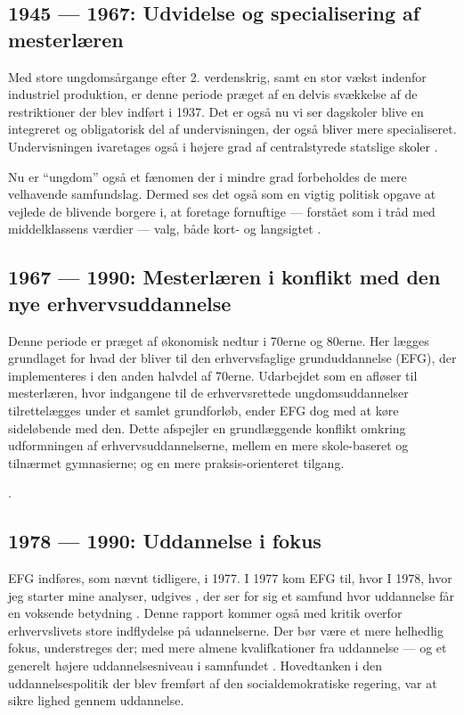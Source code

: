 {\subsection*{1945 — 1967: Udvidelse og specialisering af mesterlæren}

Med store ungdomsårgange efter 2. verdenskrig, samt en stor vækst indenfor industriel produktion, er denne periode præget af en delvis svækkelse af de restriktioner der blev indført i 1937.
Det er også nu vi ser dagskoler blive en integreret og obligatorisk del af undervisningen, der også bliver mere specialiseret.
Undervisningen ivaretages også i højere grad af centralstyrede statslige skoler \autocite[s. 35]{bondergaardHistoricalEmergenceKey2014}.

Nu er “ungdom” også et fænomen der i mindre grad forbeholdes de mere velhavende samfundslag.
Dermed ses det også som en vigtig politisk opgave at vejlede de blivende borgere i, at foretage fornuftige — forstået som i tråd med middelklassens værdier — valg, både kort- og langsigtet \autocite[s. 13ff]{juulDiskurserOmUngdom2013}.

\subsection*{1967 — 1990: Mesterlæren i konflikt med den nye erhvervsuddannelse}

Denne periode er præget af økonomisk nedtur i 70erne og 80erne.
Her lægges grundlaget for hvad der bliver til den erhvervsfaglige grunduddannelse (EFG), der implementeres i den anden halvdel af 70erne.
Udarbejdet som en afløser til mesterlæren, hvor indgangene til de erhvervsrettede ungdomsuddannelser tilrettelægges under et samlet grundforløb, ender EFG dog med at køre sideløbende med den. 
Dette afspejler en grundlæggende konflikt omkring udformningen af erhvervsuddannelserne, mellem en mere skole-baseret og tilnærmet gymnasierne; og en mere praksis-orienteret tilgang.

\autocite[s. 49ff, 57]{bondergaardHistoricalEmergenceKey2014}.

\subsection*{1978 — 1990: Uddannelse i fokus}

EFG indføres, som nævnt tidligere, i 1977.
I 1977 kom EFG til, hvor I 1978, hvor jeg starter mine analyser, udgives , der ser for sig et samfund hvor uddannelse får en voksende betydning \autocite{undervisningsministeriet90SamletUddannelsesplanlaegning1978}.
Denne rapport kommer også med kritik overfor erhvervslivets store indflydelse på udannelserne.
Der bør være et mere helhedlig fokus, understreges der; med mere almene kvalifkationer fra uddannelse — og et generelt højere uddannelsesniveau i samnfundet \autocite[s 18f]{juulDiskurserOmUngdom2013}.
Hovedtanken i den uddannelsespolitik der blev fremført af den socialdemokratiske regering, var at sikre lighed gennem uddannelse.

}
